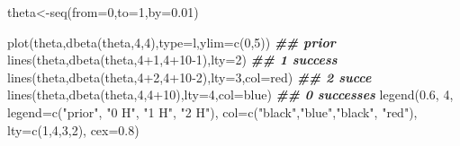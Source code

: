 \documentclass[
]{book}
\newenvironment{Shaded}{\begin{snugshade}}{\end{snugshade}}
\newcommand{\AttributeTok}[1]{\textcolor[rgb]{0.77,0.63,0.00}{#1}}
\newcommand{\DecValTok}[1]{\textcolor[rgb]{0.00,0.00,0.81}{#1}}
\newcommand{\DocumentationTok}[1]{\textcolor[rgb]{0.56,0.35,0.01}{\textbf{\textit{#1}}}}
\newcommand{\FloatTok}[1]{\textcolor[rgb]{0.00,0.00,0.81}{#1}}
\newcommand{\FunctionTok}[1]{\textcolor[rgb]{0.00,0.00,0.00}{#1}}
\newcommand{\NormalTok}[1]{#1}
\newcommand{\OtherTok}[1]{\textcolor[rgb]{0.56,0.35,0.01}{#1}}
\newcommand{\SpecialCharTok}[1]{\textcolor[rgb]{0.00,0.00,0.00}{#1}}
\newcommand{\StringTok}[1]{\textcolor[rgb]{0.31,0.60,0.02}{#1}}
\theoremstyle{definition}
\theoremstyle{definition}
\theoremstyle{definition}
\theoremstyle{definition}
\theoremstyle{remark}
\begin{document}
\begin{Shaded}
\begin{Highlighting}[]
\NormalTok{ theta}\OtherTok{\textless{}{-}}\FunctionTok{seq}\NormalTok{(}\AttributeTok{from=}\DecValTok{0}\NormalTok{,}\AttributeTok{to=}\DecValTok{1}\NormalTok{,}\AttributeTok{by=}\FloatTok{0.01}\NormalTok{)}

 \FunctionTok{plot}\NormalTok{(theta,}\FunctionTok{dbeta}\NormalTok{(theta,}\DecValTok{4}\NormalTok{,}\DecValTok{4}\NormalTok{),}\AttributeTok{type=}\StringTok{\textquotesingle{}l\textquotesingle{}}\NormalTok{,}\AttributeTok{ylim=}\FunctionTok{c}\NormalTok{(}\DecValTok{0}\NormalTok{,}\DecValTok{5}\NormalTok{)) }\DocumentationTok{\#\# prior}
 \FunctionTok{lines}\NormalTok{(theta,}\FunctionTok{dbeta}\NormalTok{(theta,}\DecValTok{4}\SpecialCharTok{+}\DecValTok{1}\NormalTok{,}\DecValTok{4}\SpecialCharTok{+}\DecValTok{10{-}1}\NormalTok{),}\AttributeTok{lty=}\DecValTok{2}\NormalTok{) }\DocumentationTok{\#\# 1 success}
   \FunctionTok{lines}\NormalTok{(theta,}\FunctionTok{dbeta}\NormalTok{(theta,}\DecValTok{4}\SpecialCharTok{+}\DecValTok{2}\NormalTok{,}\DecValTok{4}\SpecialCharTok{+}\DecValTok{10{-}2}\NormalTok{),}\AttributeTok{lty=}\DecValTok{3}\NormalTok{,}\AttributeTok{col=}\StringTok{\textquotesingle{}red\textquotesingle{}}\NormalTok{) }\DocumentationTok{\#\# 2 succe}
   \FunctionTok{lines}\NormalTok{(theta,}\FunctionTok{dbeta}\NormalTok{(theta,}\DecValTok{4}\NormalTok{,}\DecValTok{4}\SpecialCharTok{+}\DecValTok{10}\NormalTok{),}\AttributeTok{lty=}\DecValTok{4}\NormalTok{,}\AttributeTok{col=}\StringTok{\textquotesingle{}blue\textquotesingle{}}\NormalTok{)  }\DocumentationTok{\#\# 0 successes}
  \FunctionTok{legend}\NormalTok{(}\FloatTok{0.6}\NormalTok{, }\DecValTok{4}\NormalTok{, }
         \AttributeTok{legend=}\FunctionTok{c}\NormalTok{(}\StringTok{"prior"}\NormalTok{, }\StringTok{"0 H"}\NormalTok{, }\StringTok{"1 H"}\NormalTok{, }\StringTok{"2 H"}\NormalTok{),}
       \AttributeTok{col=}\FunctionTok{c}\NormalTok{(}\StringTok{"black"}\NormalTok{,}\StringTok{"blue"}\NormalTok{,}\StringTok{"black"}\NormalTok{, }\StringTok{"red"}\NormalTok{), }\AttributeTok{lty=}\FunctionTok{c}\NormalTok{(}\DecValTok{1}\NormalTok{,}\DecValTok{4}\NormalTok{,}\DecValTok{3}\NormalTok{,}\DecValTok{2}\NormalTok{), }\AttributeTok{cex=}\FloatTok{0.8}\NormalTok{)}
\end{Highlighting}
\end{Shaded}
\end{document}

